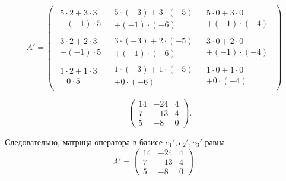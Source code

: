 \[
A'=
\begin{pmatrix}
\substack{5\cdot2+3\cdot3\\+(-1)\cdot5} &
\substack{5\cdot(-3)+3\cdot(-5)\\+(-1)\cdot(-6)} &
\substack{5\cdot0+3\cdot0\\+(-1)\cdot(-4)} \\

\substack{3\cdot2+2\cdot3\\+(-1)\cdot5} &
\substack{3\cdot(-3)+2\cdot(-5)\\+(-1)\cdot(-6)} &
\substack{3\cdot0+2\cdot0\\+(-1)\cdot(-4)} \\

\substack{1\cdot2+1\cdot3\\+0\cdot5} &
\substack{1\cdot(-3)+1\cdot(-5)\\+0\cdot(-6)} &
\substack{1\cdot0+1\cdot0\\+0\cdot(-4)}
\end{pmatrix}
\]

\[
=
\begin{pmatrix}
14 & -24 & 4\\
7 & -13 & 4\\
5 & -8 & 0
\end{pmatrix}.
\]

Следовательно, матрица оператора в базисе $e_1',e_2',e_3'$ равна
\[
A'=
\begin{pmatrix}
14 & -24 & 4\\
7 & -13 & 4\\
5 & -8 & 0
\end{pmatrix}.
\]

